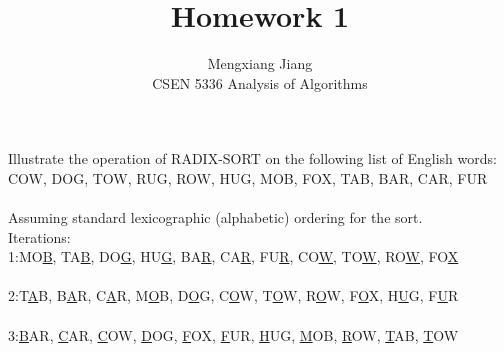 \documentclass[12pt]{article}
\newenvironment{problem}[2][Problem]{\begin{trivlist}
\item[\hskip \labelsep {\bfseries #1}\hskip \labelsep {\bfseries #2.}]}{\end{trivlist}}
\begin{document}
 
 
\title{Homework 1}%
\author{Mengxiang Jiang\\ %
CSEN 5336 Analysis of Algorithms} %
 
\maketitle
 
\begin{problem}{1} %
    Illustrate the operation of RADIX-SORT on the following list of English words: COW, DOG, TOW,
    RUG, ROW, HUG, MOB, FOX, TAB, BAR, CAR, FUR\\\\
    Assuming standard lexicographic (alphabetic) ordering for the sort.\\
    Iterations:\\
    1:MO\underline{B}, TA\underline{B}, DO\underline{G}, HU\underline{G}, BA\underline{R}, CA\underline{R}, FU\underline{R}, CO\underline{W}, TO\underline{W}, RO\underline{W}, FO\underline{X}\\\\
    2:T\underline{A}B, B\underline{A}R, C\underline{A}R, M\underline{O}B, D\underline{O}G, C\underline{O}W, T\underline{O}W, R\underline{O}W, F\underline{O}X, H\underline{U}G, F\underline{U}R\\\\
    3:\underline{B}AR, \underline{C}AR, \underline{C}OW, \underline{D}OG, \underline{F}OX, \underline{F}UR, \underline{H}UG, \underline{M}OB, \underline{R}OW, \underline{T}AB, \underline{T}OW
\end{problem}
\end{document}
